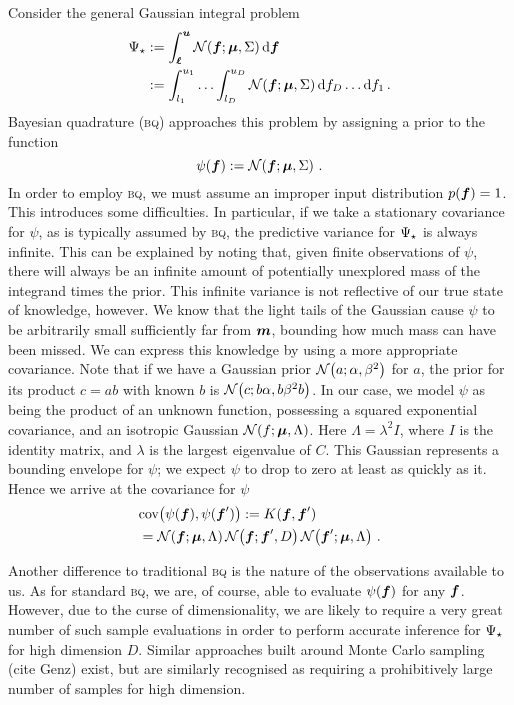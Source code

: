 \documentclass[twoside]{article}
\newcommand{\vm}{\vect{m}}
\newcommand{\vu}{\vect{u}}
\renewcommand{\sc}[1]{{\scshape #1}}
\begin{document}
Consider the general Gaussian integral problem
\begin{align}\label{eq:GI}
 \Psi\st & \deq \int_{\vl}^{\vu} \N{\vf}{\vmu}{\Sigma} \ud \vf\nonumber\\
& \deq \int_{l_1}^{u_1}\ldots\int_{l_D}^{u_D} \N{\vf}{\vmu}{\Sigma} \ud f_D \ldots \ud f_1\,.
\end{align}
Bayesian quadrature (\sc{bq}) approaches this problem by assigning a \gpb prior to the function
\begin{equation}
 \psi(\boldsymbol{f}) := \mathcal{N}\!\left(\boldsymbol{f};\boldsymbol{\mu},\Sigma\right)\,.
\end{equation}
In order to employ \sc{bq}, we must assume an improper input distribution $p(\boldsymbol{f}) = 1$. This introduces some difficulties. In particular, if we take a stationary covariance for $\psi$, as is typically assumed by \sc{bq}, the predictive variance for $\Psi_\star$ is always infinite. This can be explained by noting that, given finite observations of $\psi$, there will always be an infinite amount of potentially unexplored mass of the integrand times the prior. This infinite variance is not reflective of our true state of knowledge, however. We know that the light tails of the Gaussian cause $\psi$ to be arbitrarily small sufficiently far from $\vm$, bounding how much mass can have been missed. We can express this knowledge by using a more appropriate covariance. Note that if we have a Gaussian prior $\mathcal{N}\!\left(a;\alpha,\beta^2\right)$ for $a$, the prior for its product $c = a b$ with known $b$ is $\mathcal{N}\!\left(c;b \alpha,b \beta^2 b\right)$. In our case, we model $\psi$ as being the product of an unknown function, possessing a squared exponential covariance, and an isotropic Gaussian $\mathcal{N}\!\left(f;\boldsymbol{\mu},\Lambda\right)$. Here $\Lambda = \lambda^2 I$, where $I$ is the identity matrix, and $\lambda$ is the largest eigenvalue of $C$. This Gaussian represents a bounding envelope for $\psi$; we expect $\psi$ to drop to zero at least as quickly as it. Hence we arrive at the covariance for $\psi$
\begin{align}
 & \text{cov}\bigl(\psi(\boldsymbol{f}), \psi(\boldsymbol{f}')\bigr) := K(\boldsymbol{f}, \boldsymbol{f}')\nonumber\\ & = \mathcal{N}\!\left(\boldsymbol{f};\boldsymbol{\mu},\Lambda\right) \mathcal{N}\!\left(\boldsymbol{f};\boldsymbol{f}',D\right) \mathcal{N}\!\left(\boldsymbol{f}';\boldsymbol{\mu},\Lambda\right)\,.
\end{align}

Another difference to traditional \sc{bq} is the nature of the observations available to us. As for standard \sc{bq}, we are, of course, able to evaluate $\psi(\boldsymbol{f})$ for any $\boldsymbol{f}$. However, due to the curse of dimensionality, we are likely to require a very great number of such sample evaluations in order to perform accurate inference for $\Psi_\star$ for high dimension $D$. Similar approaches built around Monte Carlo sampling (cite Genz) exist, but are similarly recognised as requiring a prohibitively large number of samples for high dimension. 
\end{document}
